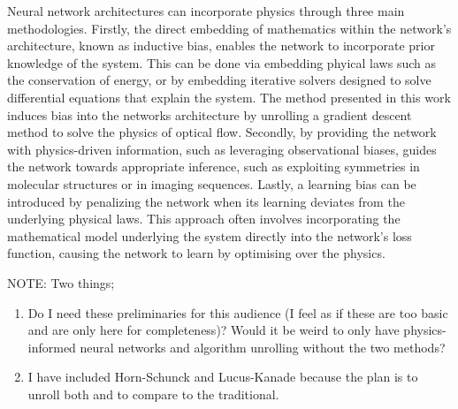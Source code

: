 \IEEEPARstart{}{} Neural network architectures can incorporate physics through three main methodologies. Firstly, the direct embedding of mathematics within the network's architecture, known as inductive bias, enables the network to incorporate prior knowledge of the system. This can be done via embedding phyical laws such as the conservation of energy, or by embedding iterative solvers designed to solve differential equations that explain the system. The method presented in this work induces bias into the networks architecture by unrolling a gradient descent method to solve the physics of optical flow. Secondly, by providing the network with physics-driven information, such as leveraging observational biases, guides the network towards appropriate inference, such as exploiting symmetries in molecular structures or in imaging sequences. Lastly, a learning bias can be introduced by penalizing the network when its learning deviates from the underlying physical laws. This approach often involves incorporating the mathematical model underlying the system directly into the network's loss function, causing the network to learn by optimising over the physics. \color{orange}

NOTE: Two things;
\begin{enumerate}
	\item Do I need these preliminaries for this audience (I feel as if these are too basic and are only here for completeness)? Would it be weird to only have physics-informed neural networks and algorithm unrolling without the two methods?
	\item I have included Horn-Schunck and Lucus-Kanade because the plan is to unroll both and to compare to the traditional.
\end{enumerate}
\color{black}




